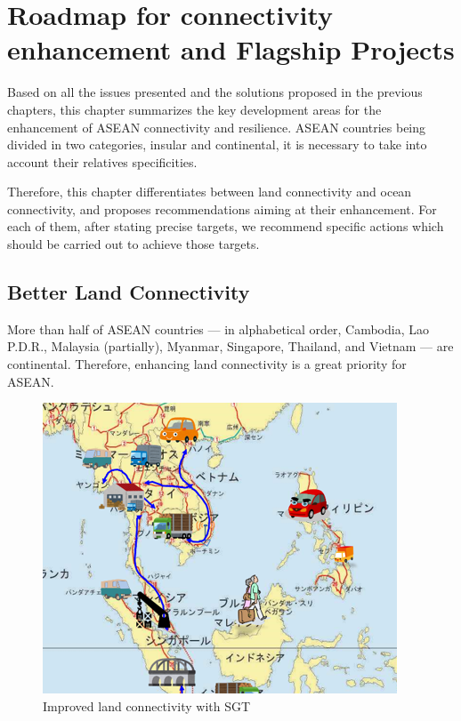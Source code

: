 \chapter{Roadmap for connectivity enhancement and Flagship Projects}

\tab Based on all the issues presented and the solutions proposed in the previous chapters, this chapter summarizes the key development areas for the enhancement of ASEAN connectivity and resilience. ASEAN countries being divided in two categories, insular and continental, it is necessary to take into account their relatives specificities.

Therefore, this chapter differentiates between land connectivity and ocean connectivity, and proposes recommendations aiming at their enhancement. For each of them, after stating precise targets, we recommend specific actions which should be carried out to achieve those targets.

\section{Better Land Connectivity} \label{land}

\tab More than half of ASEAN countries --- in alphabetical order, Cambodia, Lao P.D.R., Malaysia (partially), Myanmar, Singapore, Thailand, and Vietnam --- are continental. Therefore, enhancing land connectivity is a great priority for ASEAN.

\begin{figure}[H]
\begin{center}
\includegraphics[width = 0.8\linewidth]{Figures/land_connect.png}
\end{center}
\caption{Improved land connectivity with SGT}
\label{land_connect}
\end{figure}

